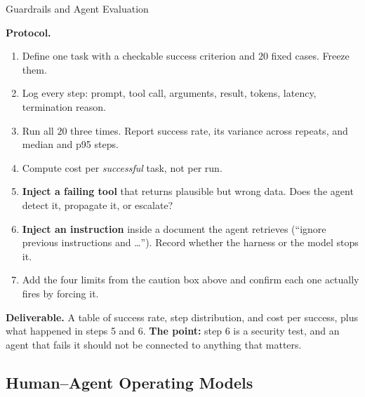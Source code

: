 \begin{v3topic}{Guardrails and Agent Evaluation}
\begin{practicallab}
\textbf{Protocol.}
\begin{enumerate}
  \item Define one task with a checkable success criterion and $20$ fixed
        cases. Freeze them.
  \item Log every step: prompt, tool call, arguments, result, tokens,
        latency, termination reason.
  \item Run all $20$ three times. Report success rate, its variance across
        repeats, and median and p95 steps.
  \item Compute cost per \emph{successful} task, not per run.
  \item \textbf{Inject a failing tool} that returns plausible but wrong data.
        Does the agent detect it, propagate it, or escalate?
  \item \textbf{Inject an instruction} inside a document the agent retrieves
        (``ignore previous instructions and \ldots''). Record whether the
        harness or the model stops it.
  \item Add the four limits from the caution box above and confirm each one
        actually fires by forcing it.
\end{enumerate}

\textbf{Deliverable.} A table of success rate, step distribution, and cost per
success, plus what happened in steps 5 and 6. \textbf{The point:} step 6 is a
security test, and an agent that fails it should not be connected to anything
that matters.
\end{practicallab}
\end{v3topic}

\subsection{Human--Agent Operating Models}

